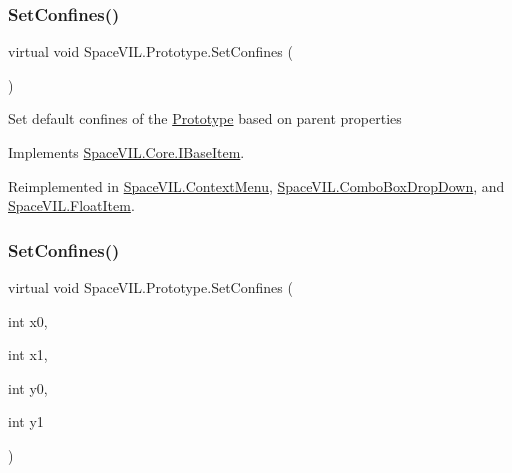 \subsubsection{\texorpdfstring{Set\+Confines()}{SetConfines()}\hspace{0.1cm}{\footnotesize\ttfamily [1/2]}}
{\footnotesize\ttfamily virtual void Space\+V\+I\+L.\+Prototype.\+Set\+Confines (\begin{DoxyParamCaption}{ }\end{DoxyParamCaption})\hspace{0.3cm}{\ttfamily [virtual]}}



Set default confines of the \mbox{\hyperlink{class_space_v_i_l_1_1_prototype}{Prototype}} based on parent properties 



Implements \mbox{\hyperlink{interface_space_v_i_l_1_1_core_1_1_i_base_item}{Space\+V\+I\+L.\+Core.\+I\+Base\+Item}}.



Reimplemented in \mbox{\hyperlink{class_space_v_i_l_1_1_context_menu_ae8eaad3b3f7858ab1d03f5a18d94e4ca}{Space\+V\+I\+L.\+Context\+Menu}}, \mbox{\hyperlink{class_space_v_i_l_1_1_combo_box_drop_down_a236066889e0b652410d02de2b4cb51c7}{Space\+V\+I\+L.\+Combo\+Box\+Drop\+Down}}, and \mbox{\hyperlink{class_space_v_i_l_1_1_float_item_ada12a95045db04f1a5e196a14f1a8d0f}{Space\+V\+I\+L.\+Float\+Item}}.

\mbox{\label{class_space_v_i_l_1_1_prototype_ac409209f9adab44b149b5dff41bb2b00}} 
\subsubsection{\texorpdfstring{Set\+Confines()}{SetConfines()}\hspace{0.1cm}{\footnotesize\ttfamily [2/2]}}
{\footnotesize\ttfamily virtual void Space\+V\+I\+L.\+Prototype.\+Set\+Confines (\begin{DoxyParamCaption}\item[{int}]{x0,  }\item[{int}]{x1,  }\item[{int}]{y0,  }\item[{int}]{y1 }\end{DoxyParamCaption})\hspace{0.3cm}{\ttfamily [virtual]}}



